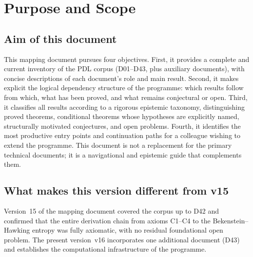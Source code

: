 \documentclass[11pt,a4paper]{article}
\theoremstyle{plain}
\theoremstyle{definition}
\theoremstyle{remark}
\newcommand{\epsGeomB}{\varepsilon_G^B}
\begin{document}
\begin{abstract}
\begin{itemize}
\end{itemize}
There is no longer any foundational open problem at the axiomatic level. The remaining open problems (OP2--OP17) concern higher-level derivations, extensions, and experimental confrontations. The most urgent near-term open problem is OP-B (D43): the algebraic identification of the geometric leakage parameter $\epsGeomB$.
\end{abstract}

\tableofcontents

\section{Purpose and Scope}
\label{sec:purpose}

\subsection{Aim of this document}
\label{subsec:aim}
This mapping document pursues four objectives. First, it provides a complete and current inventory of the PDL corpus (D01--D43, plus auxiliary documents), with concise descriptions of each document's role and main result. Second, it makes explicit the logical dependency structure of the programme: which results follow from which, what has been proved, and what remains conjectural or open. Third, it classifies all results according to a rigorous epistemic taxonomy, distinguishing proved theorems, conditional theorems whose hypotheses are explicitly named, structurally motivated conjectures, and open problems. Fourth, it identifies the most productive entry points and continuation paths for a colleague wishing to extend the programme. This document is not a replacement for the primary technical documents; it is a navigational and epistemic guide that complements them.

\subsection{What makes this version different from v15}
\label{subsec:diffv15}
Version~15 of the mapping document covered the corpus up to D42 and confirmed that the entire derivation chain from axioms C1--C4 to the Bekenstein--Hawking entropy was fully axiomatic, with no residual foundational open problem. The present version~v16 incorporates one additional document (D43) and establishes the computational infrastructure of the programme.
\end{document}
